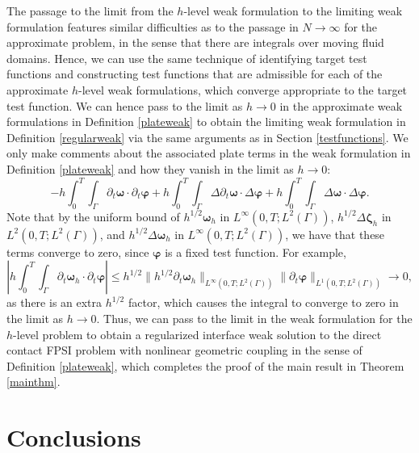 \documentclass[11pt]{article}
\newcommand{\bd}{\boldsymbol}
\theoremstyle{definition}
\begin{document}
The passage to the limit from the $h$-level weak formulation to the limiting weak formulation features similar difficulties as to the passage in $N \to \infty$ for the approximate problem, in the sense that there are integrals over moving fluid domains. Hence, we can use the same technique of identifying target test functions and constructing test functions that are admissible for each of the approximate $h$-level weak formulations, which converge appropriate to the target test function. We can hence pass to the limit as $h \to 0$ in the approximate weak formulations in Definition \ref{plateweak} to obtain the limiting weak formulation in Definition \ref{regularweak} via the same arguments as in Section \ref{testfunctions}. We only make comments about the associated plate terms in the weak formulation in Definition \ref{plateweak} and how they vanish in the limit as $h \to 0$:
\begin{equation*}
-h \int_{0}^{T} \int_{\Gamma} \partial_{t}\bd{\omega} \cdot \partial_{t}\bd{\varphi} + h \int_{0}^{T} \int_{\Gamma} \Delta \partial_{t}\bd{\omega} \cdot \Delta \bd{\varphi} + h \int_{0}^{T} \int_{\Gamma} \Delta \bd{\omega} \cdot \Delta \bd{\varphi}.
\end{equation*}
Note that by the uniform bound of $h^{1/2}\bd{\omega}_{h}$ in $L^{\infty}(0, T; L^{2}(\Gamma))$, $h^{1/2}\Delta \bd{\zeta}_{h}$ in $L^{2}(0, T; L^{2}(\Gamma))$, and $h^{1/2}\Delta \bd{\omega}_{h}$ in $L^{\infty}(0, T; L^{2}(\Gamma))$, we have that these terms converge to zero, since $\bd{\varphi}$ is a fixed test function. For example,
\begin{equation*}
\left|h \int_{0}^{T} \int_{\Gamma} \partial_{t}\bd{\omega}_{h} \cdot \partial_{t}\bd{\varphi}\right| \le h^{1/2} \|h^{1/2}\partial_{t}\bd{\omega}_{h}\|_{L^{\infty}(0, T; L^{2}(\Gamma))} \|\partial_{t}\bd{\varphi}\|_{L^{1}(0, T; L^{2}(\Gamma))} \to 0,
\end{equation*}
as there is an extra $h^{1/2}$ factor, which causes the integral to converge to zero in the limit as $h \to 0$. Thus, we can pass to the limit in the weak formulation for the $h$-level problem to obtain a regularized interface weak solution to the direct contact FPSI problem with nonlinear geometric coupling in the sense of Definition \ref{plateweak}, which completes the proof of the main result in Theorem \ref{mainthm}.

\section{Conclusions}\label{conclusion}
\end{document}
